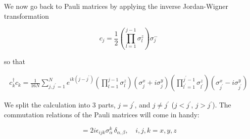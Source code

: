 \documentclass{article}
\begin{document}
We now go back to Pauli matrices by applying the inverse Jordan-Wigner transformation

\begin{equation}
c_j = \frac{1}{2} \left( \prod_{l=1}^{j-1} \sigma_l^z \right) \sigma_j^-
\end{equation}

so that

\begin{align} \label{e3}
c_k^\dag c_k = \frac{1}{16N} \sum_{j,j^{\prime}=1}^N e^{i k (j - j^{\prime})} \left( \prod_{l=1}^{j-1} \sigma_l^z \right) \left( \sigma_j^x + i \sigma_j^y\right) \left( \prod_{l^\prime=1}^{j^\prime-1} \sigma_{l^\prime}^z \right) \left( \sigma_{j^\prime}^x - i \sigma_{j^\prime}^y\right) 
\end{align}

We split the calculation into 3 parts, $j=j^\prime$, and $j\neq j^\prime$ ($j<j^\prime$, $j>j^\prime$).
The commutation relations of the Pauli matrices will come in handy:

\begin{equation}
[\sigma_\alpha^i, \sigma_\beta^j] = 2i\epsilon_{ijk} \sigma_\alpha^k \, \delta_{\alpha,\beta}, \quad i,j,k = x,y,z 
\end{equation}
\end{document}
